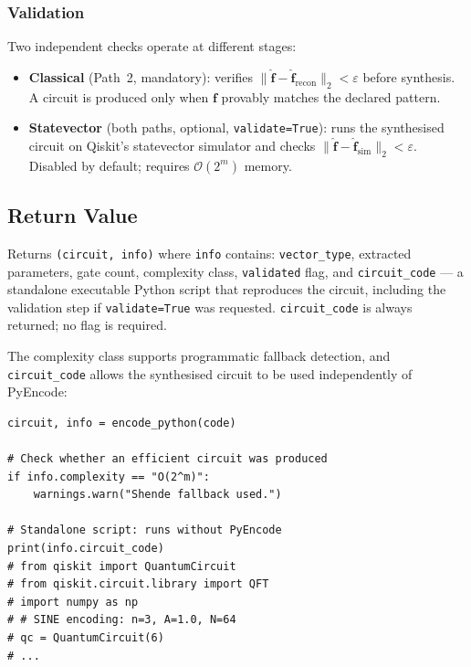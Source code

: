 \documentclass[10pt,twocolumn]{article}
\newcommand{\bigO}[1]{\mathcal{O}(#1)}
\begin{document}
\subsubsection*{Validation}

Two independent checks operate at different stages:
\begin{itemize}[leftmargin=1.4em,itemsep=2pt]
\item \textbf{Classical} (Path~2, mandatory): verifies
      $\|\hat{\mathbf{f}}-\hat{\mathbf{f}}_{\mathrm{recon}}\|_2
      < \varepsilon$ before synthesis. A circuit is
      produced only when $\mathbf{f}$ provably matches the
      declared pattern.
\item \textbf{Statevector} (both paths, optional,
      \texttt{validate=True}): runs the synthesised circuit
      on Qiskit's statevector simulator and checks
      $\|\hat{\mathbf{f}}-\hat{\mathbf{f}}_{\mathrm{sim}}\|_2
      < \varepsilon$. Disabled by default; requires
      $\bigO{2^m}$ memory.
\end{itemize}

\subsection*{Return Value}

Returns \texttt{(circuit, info)} where \texttt{info}
contains: \texttt{vector\_type}, extracted parameters,
gate count, complexity class, \texttt{validated} flag,
and \texttt{circuit\_code} --- a standalone executable
Python script that reproduces the circuit, including
the validation step if \texttt{validate=True} was
requested. \texttt{circuit\_code} is always returned;
no flag is required.

The complexity class supports programmatic fallback
detection, and \texttt{circuit\_code} allows the
synthesised circuit to be used independently of
PyEncode:
\begin{lstlisting}[style=python]
circuit, info = encode_python(code)

# Check whether an efficient circuit was produced
if info.complexity == "O(2^m)":
    warnings.warn("Shende fallback used.")

# Standalone script: runs without PyEncode
print(info.circuit_code)
# from qiskit import QuantumCircuit
# from qiskit.circuit.library import QFT
# import numpy as np
# # SINE encoding: n=3, A=1.0, N=64
# qc = QuantumCircuit(6)
# ...
\end{lstlisting}

\end{document}
